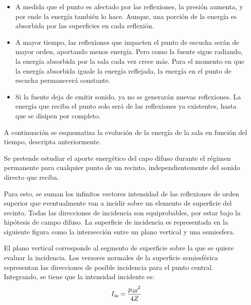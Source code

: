 \documentclass[a5paper,12pt,twoside]{book}
\begin{document}
\begin{itemize}
    \item {}
    A medida que el punto es afectado por las reflexiones, la presión aumenta, y por ende la energía también lo hace. Aunque, una porción de la energía es absorbida por las superficies en cada reflexión.
    
    \item {}
    A mayor tiempo, las reflexiones que impacten el punto de escucha serán de mayor orden, aportando menos energía. Pero como la fuente sigue radiando, la energía absorbida por la sala cada vez crece más. Para el momento en que la energía absorbida iguale la energía reflejada, la energía en el punto de escucha permanecerá constante.
    
    \item {}
    Si la fuente deja de emitir sonido, ya no se generarán nuevas reflexiones. La energía que reciba el punto solo será de las reflexiones ya existentes, hasta que se disipen por completo.
\end{itemize}

A continuación se esquematiza la evolución de la energía de la sala en función del tiempo, descripta anteriormente.

\begin{center}
    \def\svgwidth{0.5\linewidth}
    
\end{center}

Se pretende estudiar el aporte energético del capo difuso durante el régimen permanente para cualquier punto de un recinto, independientemente del sonido directo que reciba.

Para esto, se suman los infinitos vectores intensidad de las reflexiones de orden superior que eventualmente van a incidir sobre un elemento de superficie del recinto. Todas las direcciones de incidencia son equiprobables, por estar bajo la hipótesis de campo difuso. La superficie de incidencia es representada en la siguiente figura como la intersección entre un plano vertical y una semiesfera.

\begin{center}
    \def\svgwidth{0.6\linewidth}
    
\end{center}

El plano vertical corresponde al segmento de superficie sobre la que se quiere evaluar la incidencia. Los versores normales de la superficie semiesférica representan las direcciones de posible incidencia para el punto central. Integrando, se tiene que la intensidad incidente es: %
\begin{equation} 
    {{I}_\textsl{{in}}} = \frac{{{p}_\textsl{{dif}}}^2}{4 Z}
    \label{eqn:Idiffuse}
\end{equation}
\end{document}
